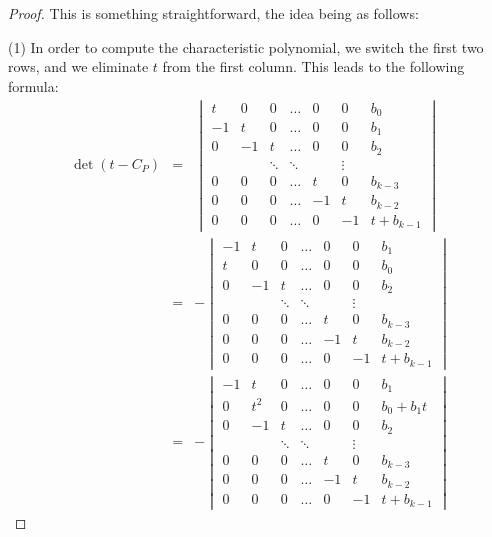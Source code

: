 \documentclass[12pt]{amsbook}
\begin{document}
\begin{proof}
This is something straightforward, the idea being as follows:

\medskip

(1) In order to compute the characteristic polynomial, we switch the first two rows, and we eliminate $t$ from the first column. This leads to the following formula:
\begin{eqnarray*}
\det(t-C_P)
&=&\begin{vmatrix}
t&0&0&\ldots&0&0&b_0\\
-1&t&0&\ldots&0&0&b_1\\
0&-1&t&\ldots&0&0&b_2\\
&&\ddots&\ddots&&\vdots\\
0&0&0&\ldots&t&0&b_{k-3}\\
0&0&0&\ldots&-1&t&b_{k-2}\\
0&0&0&\ldots&0&-1&t+b_{k-1}
\end{vmatrix}\\
&=&-\begin{vmatrix}
-1&t&0&\ldots&0&0&b_1\\
t&0&0&\ldots&0&0&b_0\\
0&-1&t&\ldots&0&0&b_2\\
&&\ddots&\ddots&&\vdots\\
0&0&0&\ldots&t&0&b_{k-3}\\
0&0&0&\ldots&-1&t&b_{k-2}\\
0&0&0&\ldots&0&-1&t+b_{k-1}
\end{vmatrix}\\
&=&-\begin{vmatrix}
-1&t&0&\ldots&0&0&b_1\\
0&t^2&0&\ldots&0&0&b_0+b_1t\\
0&-1&t&\ldots&0&0&b_2\\
&&\ddots&\ddots&&\vdots\\
0&0&0&\ldots&t&0&b_{k-3}\\
0&0&0&\ldots&-1&t&b_{k-2}\\
0&0&0&\ldots&0&-1&t+b_{k-1}
\end{vmatrix}
\end{eqnarray*}


\end{proof}
\end{document}
